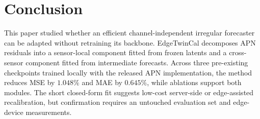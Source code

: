 \documentclass[conference]{IEEEtran}
\begin{document}
\section{Conclusion}
This paper studied whether an efficient channel-independent irregular forecaster can be adapted without retraining its backbone. EdgeTwinCal decomposes APN residuals into a sensor-local component fitted from frozen latents and a cross-sensor component fitted from intermediate forecasts. Across three pre-existing checkpoints trained locally with the released APN implementation, the method reduces MSE by $1.048\%$ and MAE by $0.645\%$, while ablations support both modules. The short closed-form fit suggests low-cost server-side or edge-assisted recalibration, but confirmation requires an untouched evaluation set and edge-device measurements.



\end{document}
